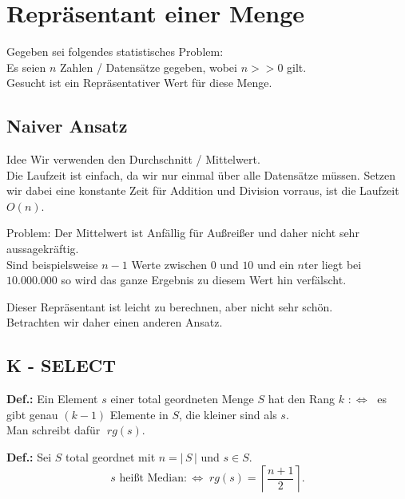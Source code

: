 \chapter{Repräsentant einer Menge}

Gegeben sei folgendes statistisches Problem:\\
Es seien $n$ Zahlen / Datensätze gegeben, wobei $n >> 0$ gilt.\\
Gesucht ist ein Repräsentativer Wert für diese Menge.

\section{Naiver Ansatz}

\begin{description}

\item{Idee} Wir verwenden den Durchschnitt / Mittelwert.\\
Die Laufzeit ist einfach, da wir nur einmal über alle Datensätze müssen. Setzen wir dabei eine konstante Zeit für Addition und Division vorraus, ist die Laufzeit $O(n)$.

\item{Problem:} Der Mittelwert ist Anfällig für Außreißer und daher nicht sehr aussagekräftig.\\
Sind beispielsweise $n-1$ Werte zwischen $0$ und $10$ und ein $n$ter liegt bei $10.000.000$ so wird das ganze Ergebnis zu diesem Wert hin verfälscht.

\end{description}

Dieser Repräsentant ist leicht zu berechnen, aber nicht sehr schön.\\
Betrachten wir daher einen anderen Ansatz.

\section{K - SELECT}

\begin{description}

\item{\bfseries Def.:} Ein Element $s$ einer total geordneten Menge $S$ hat den Rang $k$ $:\Leftrightarrow \;$ es gibt genau $(k-1)$ Elemente in $S$, die kleiner sind als $s$.\\

Man schreibt dafür $\; rg(s)$.

\item{\bfseries Def.:} Sei $S$ total geordnet mit $n = |\,S\,|$ und $s\in S$.\\
$$s \text{ heißt Median} :\Leftrightarrow \; rg(s) = \left\lceil \frac{n+1}{2} \right\rceil .$$

\end{description}

